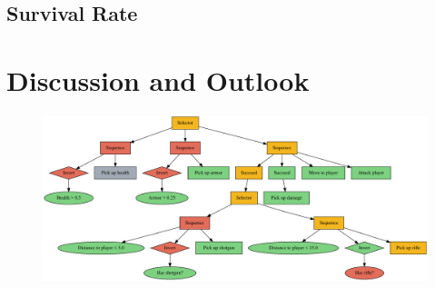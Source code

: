 \documentclass[a4paper, twocolumn]{article}
\begin{document}
        \subsection{Survival Rate} \label{sec:survival_rate}



    \section{Discussion and Outlook} \label{sec:discussion_and_outlook}

    \onecolumn
    \clearpage

    \appendix
    \thispagestyle{empty}

    \begin{figure}[H]
        \centering
        \includegraphics[angle=90,height=0.98\textheight]{share/hand_crafted_behaviour_tree.pdf}
    \end{figure}
\end{document}
